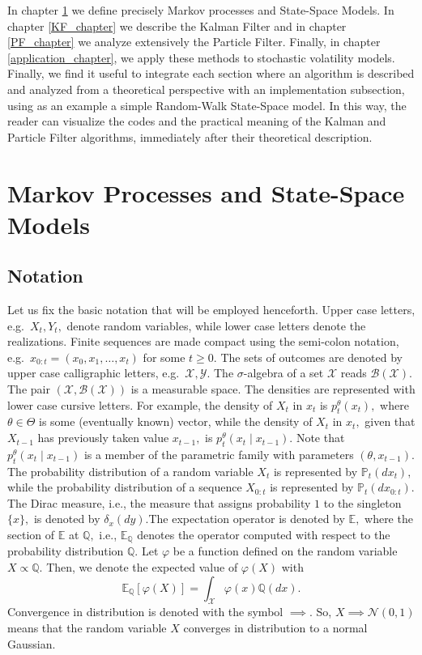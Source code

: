 \documentclass[
]{book}
\theoremstyle{break}
\theoremstyle{nonumberplain}
\begin{document}
In chapter \ref{MP_SSM_chapter} we define precisely Markov processes and
State-Space Models. In chapter \ref{KF_chapter} we describe the Kalman
Filter and in chapter \ref{PF_chapter} we analyze extensively the
Particle Filter. Finally, in chapter \ref{application_chapter}, we apply
these methods to stochastic volatility models.\\
Finally, we find it useful to integrate each section where an algorithm
is described and analyzed from a theoretical perspective with an
implementation subsection, using as an example a simple Random-Walk
State-Space model. In this way, the reader can visualize the codes and
the practical meaning of the Kalman and Particle Filter algorithms,
immediately after their theoretical description.

\chapter{Markov Processes and State-Space Models}\label{MP_SSM_chapter}

\section{Notation}

Let us fix the basic notation that will be employed henceforth. Upper
case letters, e.g.~\(X_t, Y_t,\) denote random variables, while lower
case letters denote the realizations. Finite sequences are made compact
using the semi-colon notation, e.g.~\(x_{0:t}=(x_0, x_1, \dots, x_t)\)
for some \(t \geq 0.\) The sets of outcomes are denoted by upper case
calligraphic letters, e.g.~\(\mathcal{X}, \mathcal{Y}.\) The
\(\sigma\)-algebra of a set \(\mathcal{X}\) reads
\(\mathcal{B}(\mathcal{X}).\) The pair
\((\mathcal{X}, \mathcal{B}(\mathcal{X}))\) is a measurable space. The
densities are represented with lower case cursive letters. For example,
the density of \(X_t\) in \(x_t\) is \(p_t^\theta(x_t),\) where
\(\theta\in\Theta\) is some (eventually known) vector, while the density
of \(X_t\) in \(x_t,\) given that \(X_{t-1}\) has previously taken value
\(x_{t-1},\) is \(p_t^\theta(x_t\mid x_{t-1}).\) Note that
\(p_t^\theta(x_t\mid x_{t-1})\) is a member of the parametric family
with parameters \((\theta, x_{t-1})\). The probability distribution of a
random variable \(X_t\) is represented by \(\mathbb{P}_t(dx_t),\) while
the probability distribution of a sequence \(X_{0:t}\) is represented by
\(\mathbb{P}_t(dx_{0:t}).\) The Dirac measure, i.e., the measure that
assigns probability \(1\) to the singleton \(\{x\},\) is denoted by
\(\delta_x(dy)\).The expectation operator is denoted by \(\mathbb{E},\)
where the section of \(\mathbb{E}\) at \(\mathbb{Q},\) i.e.,
\(\mathbb{E}_{\mathbb{Q}}\) denotes the operator computed with respect
to the probability distribution \(\mathbb{Q}.\) Let \(\varphi\) be a
function defined on the random variable \(X\propto\mathbb{Q}.\) Then, we
denote the expected value of \(\varphi(X)\) with \[
    \mathbb{E}_{\mathbb{Q}}[\varphi(X)]=
    \int_{\mathcal{X}}\varphi(x)\mathbb{Q}(dx).
\] Convergence in distribution is denoted with the symbol \(\implies.\)
So, \(X\implies\mathcal N(0,1)\) means that the random variable \(X\)
converges in distribution to a normal Gaussian.
\end{document}
